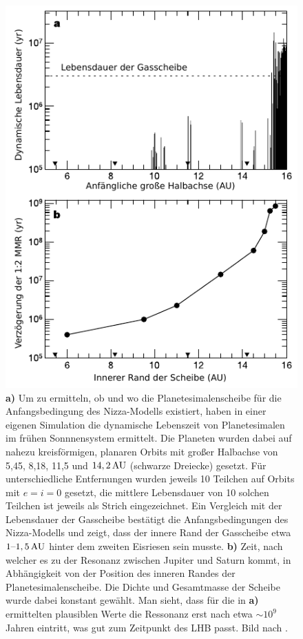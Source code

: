 \documentclass[12pt,a4paper,twoside,open=right,bibliography=totoc]{scrbook}
\renewcommand{\cite}{ \citep}
\begin{document}
\begin{figure}[tbn]
\centering
\includegraphics[scale=1]{img/Gomes2005-1.pdf}
\caption{\textbf{a)} Um zu ermitteln, ob und wo die Planetesimalenscheibe für die Anfangsbedingung des Nizza-Modells existiert, haben \cite{Gomes2005} in einer eigenen Simulation die dynamische Lebenszeit von Planetesimalen im frühen Sonnnensystem ermittelt. Die Planeten wurden dabei auf nahezu kreisförmigen, planaren Orbits mit großer Halbachse von 5,45, 8,18, 11,5 und $\unit[14,2]{AU}$ (schwarze Dreiecke) gesetzt. Für unterschiedliche Entfernungen wurden jeweils 10 Teilchen auf Orbits mit $e=i=0$ gesetzt, die mittlere Lebensdauer von 10 solchen Teilchen ist jeweils als Strich eingezeichnet. Ein Vergleich mit der Lebensdauer der Gasscheibe bestätigt die Anfangsbedingungen des Nizza-Modells und zeigt, dass der innere Rand der Gasscheibe etwa $\unit[1\text{--}1,5]{AU}$ hinter dem zweiten Eisriesen sein musste.
\textbf{b)} Zeit, nach welcher es zu der Resonanz zwischen Jupiter und Saturn kommt, in Abhängigkeit von der Position des inneren Randes der Planetesimalenscheibe. Die Dichte und Gesamtmasse der Scheibe wurde dabei konstant gewählt. Man sieht, dass für die in {\textbf{a)}} ermittelten plausiblen Werte die Ressonanz erst nach etwa $\sim10^9$ Jahren eintritt, was gut zum Zeitpunkt des LHB passt. Bild nach \cite{Gomes2005}.}
\label{fig:LHBtiming}
\end{figure} %
\end{document}
